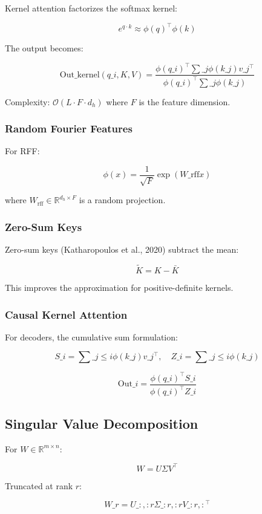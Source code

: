 Kernel attention factorizes the softmax kernel:

\[
e^{q \cdot k} \approx \phi(q)^\top \phi(k)
\]

The output becomes:

\[
\text{Out}\_\text{kernel}(q\_i, K, V) = \frac{\phi(q\_i)^\top \sum\_j \phi(k\_j) v\_j^\top}{\phi(q\_i)^\top \sum\_j \phi(k\_j)}
\]

Complexity: $\mathcal{O}(L \cdot F \cdot d_h)$ where $F$ is the feature 
dimension.

\subsubsection{Random Fourier Features}

For RFF:

\[
\phi(x) = \frac{1}{\sqrt{F}} \exp\!\left(W\_\text{rff} x\right)
\]

where $W_\text{rff} \in \mathbb{R}^{d_h \times F}$ is a random projection.

\subsubsection{Zero-Sum Keys}

Zero-sum keys (Katharopoulos et al., 2020) subtract the mean:

\[
\tilde{K} = K - \bar{K}
\]

This improves the approximation for positive-definite kernels.

\subsubsection{Causal Kernel Attention}

For decoders, the cumulative sum formulation:

\[
S\_i = \sum\_{j \leq i} \phi(k\_j) v\_j^\top, \quad
Z\_i = \sum\_{j \leq i} \phi(k\_j)
\]

\[
\text{Out}\_i = \frac{\phi(q\_i)^\top S\_i}{\phi(q\_i)^\top Z\_i}
\]

\subsection{Singular Value Decomposition}

For $W \in \mathbb{R}^{m \times n}$:

\[
W = U \Sigma V^\top
\]

Truncated at rank $r$:

\[
W\_r = U\_{:, :r} \Sigma\_{:r, :r} V\_{:r, :}^\top
\]

